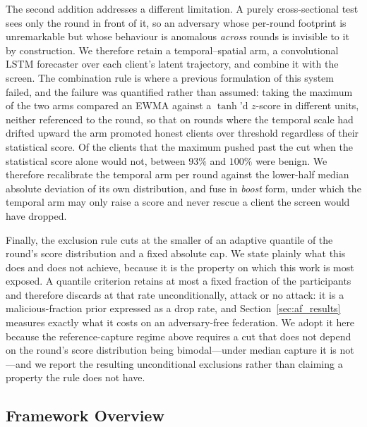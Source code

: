 \documentclass[journal]{IEEEtran}
\begin{document}
The second addition addresses a different limitation. A purely cross-sectional test sees only the round in front of it, so an adversary whose per-round footprint is unremarkable but whose behaviour is anomalous \emph{across} rounds is invisible to it by construction. We therefore retain a temporal--spatial arm, a convolutional LSTM forecaster over each client's latent trajectory, and combine it with the screen. The combination rule is where a previous formulation of this system failed, and the failure was quantified rather than assumed: taking the maximum of the two arms compared an EWMA against a $\tanh$'d $z$-score in different units, neither referenced to the round, so that on rounds where the temporal scale had drifted upward the arm promoted honest clients over threshold regardless of their statistical score. Of the clients that the maximum pushed past the cut when the statistical score alone would not, between $93\%$ and $100\%$ were benign. We therefore recalibrate the temporal arm per round against the lower-half median absolute deviation of its own distribution, and fuse in \emph{boost} form, under which the temporal arm may only raise a score and never rescue a client the screen would have dropped.

Finally, the exclusion rule cuts at the smaller of an adaptive quantile of the round's score distribution and a fixed absolute cap. We state plainly what this does and does not achieve, because it is the property on which this work is most exposed. A quantile criterion retains at most a fixed fraction of the participants and therefore discards at that rate unconditionally, attack or no attack: it is a malicious-fraction prior expressed as a drop rate, and Section~\ref{sec:af_results} measures exactly what it costs on an adversary-free federation. We adopt it here because the reference-capture regime above requires a cut that does not depend on the round's score distribution being bimodal---under median capture it is not---and we report the resulting unconditional exclusions rather than claiming a property the rule does not have.

\subsection{Framework Overview}
\end{document}
